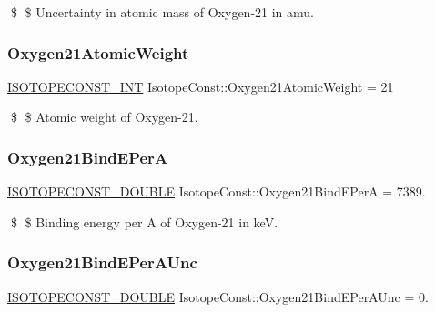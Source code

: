 \$ \$ Uncertainty in atomic mass of Oxygen-\/21 in amu. \mbox{\label{group___isotope_const-_oxygen-_o21_ga8deb85c2f8b91d63f303f3c0bff7427a}} 
\subsubsection{\texorpdfstring{Oxygen21\+Atomic\+Weight}{Oxygen21AtomicWeight}}
{\footnotesize\ttfamily \mbox{\hyperlink{group___isotope_const-_macros_ga5f18360b3e99483a35c32d789e62621c}{I\+S\+O\+T\+O\+P\+E\+C\+O\+N\+S\+T\+\_\+\+I\+NT}} Isotope\+Const\+::\+Oxygen21\+Atomic\+Weight = 21}

\$ \$ Atomic weight of Oxygen-\/21. \mbox{\label{group___isotope_const-_oxygen-_o21_ga0a41409ad0606d58bdfbe54e240db187}} 
\subsubsection{\texorpdfstring{Oxygen21\+Bind\+E\+PerA}{Oxygen21BindEPerA}}
{\footnotesize\ttfamily \mbox{\hyperlink{group___isotope_const-_macros_ga8f45a7272ce02c0b4c65c44636ed719a}{I\+S\+O\+T\+O\+P\+E\+C\+O\+N\+S\+T\+\_\+\+D\+O\+U\+B\+LE}} Isotope\+Const\+::\+Oxygen21\+Bind\+E\+PerA = 7389.}

\$ \$ Binding energy per A of Oxygen-\/21 in keV. \mbox{\label{group___isotope_const-_oxygen-_o21_ga6af54194c24c9d9d976f204e26321c91}} 
\subsubsection{\texorpdfstring{Oxygen21\+Bind\+E\+Per\+A\+Unc}{Oxygen21BindEPerAUnc}}
{\footnotesize\ttfamily \mbox{\hyperlink{group___isotope_const-_macros_ga8f45a7272ce02c0b4c65c44636ed719a}{I\+S\+O\+T\+O\+P\+E\+C\+O\+N\+S\+T\+\_\+\+D\+O\+U\+B\+LE}} Isotope\+Const\+::\+Oxygen21\+Bind\+E\+Per\+A\+Unc = 0.}

